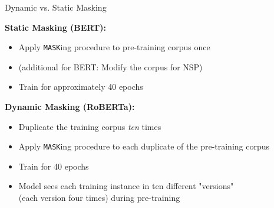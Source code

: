 \begin{frame}{Dynamic vs. Static Masking \href{https://arxiv.org/pdf/1907.11692.pdf}{}}

	\textbf{Static Masking (BERT):}

	\begin{itemize}
		\item Apply \texttt{MASK}ing procedure to pre-training corpus once
		\item (additional for BERT: Modify the corpus for NSP)
		\item Train for approximately 40 epochs
	\end{itemize}

\vspace{.3cm}

	\textbf{Dynamic Masking (RoBERTa):}

	\begin{itemize}
		\item Duplicate the training corpus \textit{ten} times
		\item Apply \texttt{MASK}ing procedure to each duplicate of the pre-training corpus
		\item Train for 40 epochs
		\item Model sees each training instance in ten different "versions"\\
					(each version four times) during pre-training
	\end{itemize}
\end{frame}

